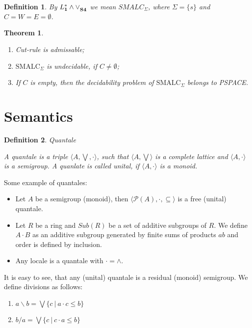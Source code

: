 \documentclass[a4paper]{article}
\theoremstyle{defin}
\newtheorem{defin}{Definition}
\theoremstyle{theorem}
\newtheorem{theorem}{Theorem}
\theoremstyle{prop}
\theoremstyle{lemma}
\theoremstyle{ex}
\theoremstyle{col}
\begin{document}
\begin{defin}
  By ${L^{*}_{\bf 1} \land \lor}_{\bf S4}$ we mean $SMALC_{\Sigma}$, where $\Sigma = \{ s \}$ and $C = W = E = \emptyset$.
\end{defin}


\begin{theorem}
$ $

  \begin{enumerate}
    \item Cut-rule is admissable;
    \item $\text{SMALC}_{\Sigma}$ is undecidable, if $C \neq \emptyset$;
    \item If $C$ is empty, then the decidability problem of $\text{SMALC}_{\Sigma}$ belongs to PSPACE.
  \end{enumerate}
\end{theorem}

\section{Semantics}

\begin{defin} Quantale
$ $

  A quantale is a triple $\langle A, \bigvee, \cdot \rangle$, such that $\langle A, \bigvee \rangle$
is a complete lattice and $\langle A, \cdot \rangle$ is a semigroup. A quanlate is called unital, if $\langle A, \cdot \rangle$
is a monoid.
\end{defin}

Some example of quantales:

\begin{itemize}
\item Let $A$ be a semigroup (monoid), then $\langle \mathcal{P}(A), \cdot, \subseteq \rangle$
is a free (unital) quantale.
\item Let $R$ be a ring and $Sub(R)$ be a set of additive subgroups of $R$.
We define $A \cdot B$ as an additive subgroup generated by finite sums of products $ab$ and order is defined by inclusion.
\item Any locale is a quantale with $\cdot = \wedge$.
\end{itemize}

It is easy to see, that any (unital) quantale is a residual (monoid) semigroup. We define divisions as follows:

\begin{enumerate}
\item $a \backslash b = \bigvee \{ c \: | \: a \cdot c \leq b \}$
\item $b / a = \bigvee \{ c \: | \: c \cdot a \leq b \}$
\end{enumerate}
\end{document}
